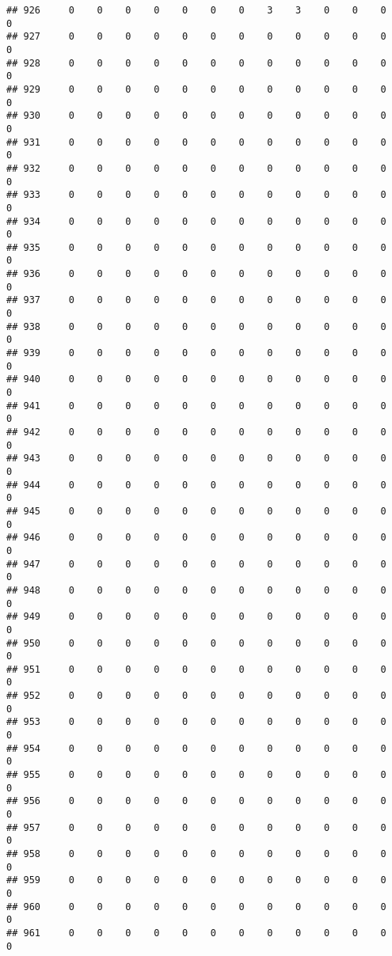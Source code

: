 \documentclass[]{article}
\begin{document}
\begin{verbatim}
## 926     0    0    0    0    0    0    0    3    3    0    0    0    0
## 927     0    0    0    0    0    0    0    0    0    0    0    0    0
## 928     0    0    0    0    0    0    0    0    0    0    0    0    0
## 929     0    0    0    0    0    0    0    0    0    0    0    0    0
## 930     0    0    0    0    0    0    0    0    0    0    0    0    0
## 931     0    0    0    0    0    0    0    0    0    0    0    0    0
## 932     0    0    0    0    0    0    0    0    0    0    0    0    0
## 933     0    0    0    0    0    0    0    0    0    0    0    0    0
## 934     0    0    0    0    0    0    0    0    0    0    0    0    0
## 935     0    0    0    0    0    0    0    0    0    0    0    0    0
## 936     0    0    0    0    0    0    0    0    0    0    0    0    0
## 937     0    0    0    0    0    0    0    0    0    0    0    0    0
## 938     0    0    0    0    0    0    0    0    0    0    0    0    0
## 939     0    0    0    0    0    0    0    0    0    0    0    0    0
## 940     0    0    0    0    0    0    0    0    0    0    0    0    0
## 941     0    0    0    0    0    0    0    0    0    0    0    0    0
## 942     0    0    0    0    0    0    0    0    0    0    0    0    0
## 943     0    0    0    0    0    0    0    0    0    0    0    0    0
## 944     0    0    0    0    0    0    0    0    0    0    0    0    0
## 945     0    0    0    0    0    0    0    0    0    0    0    0    0
## 946     0    0    0    0    0    0    0    0    0    0    0    0    0
## 947     0    0    0    0    0    0    0    0    0    0    0    0    0
## 948     0    0    0    0    0    0    0    0    0    0    0    0    0
## 949     0    0    0    0    0    0    0    0    0    0    0    0    0
## 950     0    0    0    0    0    0    0    0    0    0    0    0    0
## 951     0    0    0    0    0    0    0    0    0    0    0    0    0
## 952     0    0    0    0    0    0    0    0    0    0    0    0    0
## 953     0    0    0    0    0    0    0    0    0    0    0    0    0
## 954     0    0    0    0    0    0    0    0    0    0    0    0    0
## 955     0    0    0    0    0    0    0    0    0    0    0    0    0
## 956     0    0    0    0    0    0    0    0    0    0    0    0    0
## 957     0    0    0    0    0    0    0    0    0    0    0    0    0
## 958     0    0    0    0    0    0    0    0    0    0    0    0    0
## 959     0    0    0    0    0    0    0    0    0    0    0    0    0
## 960     0    0    0    0    0    0    0    0    0    0    0    0    0
## 961     0    0    0    0    0    0    0    0    0    0    0    0    0

\end{verbatim}
\end{document}
